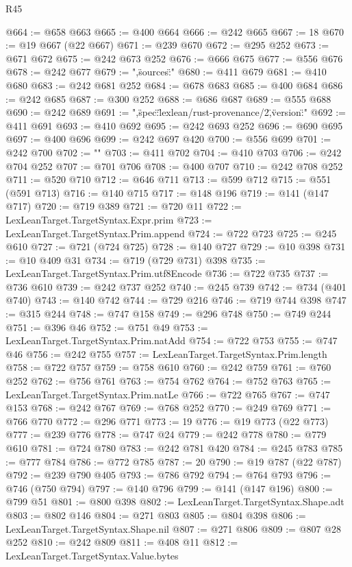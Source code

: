 \begin{lexlean}{R45}
\begin{coremodule}
{@664 := @658 @663
@665 := @400 @664
@666 := @242 @665
@667 := 18
@670 := @19 @667 (@22 @667)
@671 := @239 @670
@672 := @295 @252
@673 := @671 @672
@675 := @242 @673 @252
@676 := @666 @675
@677 := @556 @676
@678 := @242 @677
@679 := ",\"sources\":"
@680 := @411 @679
@681 := @410 @680
@683 := @242 @681 @252
@684 := @678 @683
@685 := @400 @684
@686 := @242 @685
@687 := @300 @252
@688 := @686 @687
@689 := @555 @688
@690 := @242 @689
@691 := ",\"spec\":\"lexlean/rust-provenance/2\",\"version\":"
@692 := @411 @691
@693 := @410 @692
@695 := @242 @693 @252
@696 := @690 @695
@697 := @400 @696
@699 := @242 @697 @420
@700 := @556 @699
@701 := @242 @700
@702 := "}\n"
@703 := @411 @702
@704 := @410 @703
@706 := @242 @704 @252
@707 := @701 @706
@708 := @400 @707
@710 := @242 @708 @252
@711 := @520 @710
@712 := @646 @711
@713 := @599 @712
@715 := @551 (@591 @713)
@716 := @140 @715
@717 := @148 @196
@719 := @141 (@147 @717)
@720 := @719 @389
@721 := @720 @11
@722 := LexLeanTarget.TargetSyntax.Expr.prim
@723 := LexLeanTarget.TargetSyntax.Prim.append
@724 := @722 @723
@725 := @245 @610
@727 := @721 (@724 @725)
@728 := @140 @727
@729 := @10 @398
@731 := @10 @409 @31
@734 := @719 (@729 @731) @398
@735 := LexLeanTarget.TargetSyntax.Prim.utf8Encode
@736 := @722 @735
@737 := @736 @610
@739 := @242 @737 @252
@740 := @245 @739
@742 := @734 (@401 @740)
@743 := @140 @742
@744 := @729 @216
@746 := @719 @744 @398
@747 := @315 @244
@748 := @747 @158
@749 := @296 @748
@750 := @749 @244
@751 := @396 @46
@752 := @751 @49
@753 := LexLeanTarget.TargetSyntax.Prim.natAdd
@754 := @722 @753
@755 := @747 @46
@756 := @242 @755
@757 := LexLeanTarget.TargetSyntax.Prim.length
@758 := @722 @757
@759 := @758 @610
@760 := @242 @759
@761 := @760 @252
@762 := @756 @761
@763 := @754 @762
@764 := @752 @763
@765 := LexLeanTarget.TargetSyntax.Prim.natLe
@766 := @722 @765
@767 := @747 @153
@768 := @242 @767
@769 := @768 @252
@770 := @249 @769
@771 := @766 @770
@772 := @296 @771
@773 := 19
@776 := @19 @773 (@22 @773)
@777 := @239 @776
@778 := @747 @24
@779 := @242 @778
@780 := @779 @610
@781 := @724 @780
@783 := @242 @781 @420
@784 := @245 @783
@785 := @777 @784
@786 := @772 @785
@787 := 20
@790 := @19 @787 (@22 @787)
@792 := @239 @790 @405
@793 := @786 @792
@794 := @764 @793
@796 := @746 (@750 @794)
@797 := @140 @796
@799 := @141 (@147 @196)
@800 := @799 @51
@801 := @800 @398
@802 := LexLeanTarget.TargetSyntax.Shape.adt
@803 := @802 @146
@804 := @271 @803
@805 := @804 @398
@806 := LexLeanTarget.TargetSyntax.Shape.nil
@807 := @271 @806
@809 := @807 @28 @252
@810 := @242 @809
@811 := @408 @11
@812 := LexLeanTarget.TargetSyntax.Value.bytes

\end{coremodule}
\end{lexlean}
